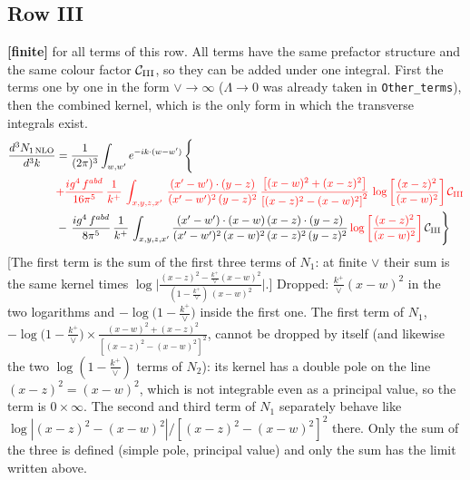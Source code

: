 \documentclass[9pt]{article}
\numberwithin{equation}{section}
\begin{document}
\subsection{Row III}
\textbf{[finite]} for all terms of this row. All terms have the same prefactor structure and the same colour factor $\mathcal{C}_{\rm III}$, so they can be added under one integral. First the terms one by one in the form $\vee\to\infty$ ($\Lambda\to0$ was already taken in \texttt{Other\_terms}), then the combined kernel, which is the only form in which the transverse integrals exist.
\begin{align}
   \frac{d^{3}N_{1\,\rm NLO}}{d^{3}k}  & =  \frac{1}{(2\pi)^{3}}  \int_{w, w^\prime} e^{-ik\cdot(w-w^\prime)}\, \Bigg\{\notag\\
& {\color{red}+\frac{ig^{4}\,f^{abd}}{16\pi^{5}}\, \frac{1}{k^{+}}\,\int_{x,y,z,x'}\, \frac{(x'-w')\cdot (y-z)}{(x'-w')^{2}\,(y-z)^{2}}\, \frac{\left[(x-w)^{2}+(x-z)^{2}\right]}{\left[(x-z)^{2}-(x-w)^{2}\right]^{2}}\,\log{\left[\frac{(x-z)^{2}}{(x-w)^{2}}\right]}\,\mathcal{C}_{\rm III}}\notag \\
&-\, \frac{ig^{4}\,f^{abd}}{8\pi^{5}}\,\frac{1}{k^{+}}\,\int_{x,y,z,x'}\frac{(x'-w')\cdot (x-w)\, (x-z)\cdot (y-z)}{(x'-w')^{2}\, (x-w)^{2}\, (x-z)^{2}\, (y-z)^{2}}\,{\color{red}\log{\left[\frac{(x-z)^{2}}{(x-w)^{2}}\right]}}\,\mathcal{C}_{\rm III}\Bigg\}
\end{align}
{\color{red}[The first term is the sum of the first three terms of $N_{1}$: at finite $\vee$ their sum is the same kernel times $\log\Big|\frac{(x-z)^{2}-\frac{k^{+}}{\vee}(x-w)^{2}}{(1-\frac{k^{+}}{\vee})\,(x-w)^{2}}\Big|$.]} {\color{orange}Dropped: $\frac{k^{+}}{\vee}(x-w)^{2}$ in the two logarithms and $-\log\big(1-\frac{k^{+}}{\vee}\big)$ inside the first one.}
{\color{magenta} The first term of $N_{1}$, $-\log\big(1-\frac{k^{+}}{\vee}\big)\times\frac{(x-w)^{2}+(x-z)^{2}}{[(x-z)^{2}-(x-w)^{2}]^{2}}$, cannot be dropped by itself (and likewise the two $\log(1-\frac{k^{+}}{\vee})$ terms of $N_{2}$): its kernel has a double pole on the line $(x-z)^{2}=(x-w)^{2}$, which is not integrable even as a principal value, so the term is $0\times\infty$. The second and third term of $N_{1}$ separately behave like $\log|(x-z)^{2}-(x-w)^{2}|/[(x-z)^{2}-(x-w)^{2}]^{2}$ there. Only the sum of the three is defined (simple pole, principal value) and only the sum has the limit written above.}
\end{document}
